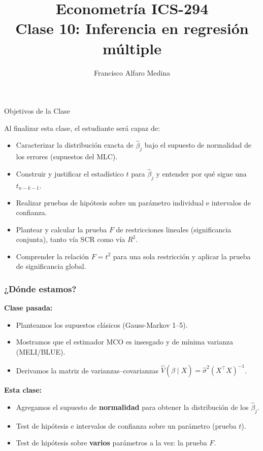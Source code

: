 \documentclass{beamer}
\title[ICS-294]{Econometría ICS-294\\ \small{Clase 10: Inferencia en regresión múltiple}}
\author{Francisco Alfaro Medina}
\institute[USM]
{Universidad Técnica Federico Santa María\\ %
	\medskip
	\textit{francisco.alfaro@usm.cl} %

}
\date{}
\begin{document}
\begin{frame}
	\titlepage %


\end{frame}
\logo{}

\begin{frame}{Objetivos de la Clase}

Al finalizar esta clase, el estudiante será capaz de:

\begin{itemize}
    \item[\checkmark] Caracterizar la distribución exacta de $\hat{\beta}_j$ bajo el supuesto de normalidad de los errores (supuestos del MLC).
    \item[\checkmark] Construir y justificar el estadístico $t$ para $\hat{\beta}_j$ y entender por qué sigue una $t_{n-k-1}$.
    \item[\checkmark] Realizar pruebas de hipótesis sobre un parámetro individual e intervalos de confianza.
    \item[\checkmark] Plantear y calcular la prueba $F$ de restricciones lineales (significancia conjunta), tanto vía SCR como vía $R^2$.
    \item[\checkmark] Comprender la relación $F = t^2$ para una sola restricción y aplicar la prueba de significancia global.
\end{itemize}

\end{frame}

\begin{frame}
\frametitle{¿Dónde estamos?}
\textbf{Clase pasada:}
\begin{itemize}
    \item Planteamos los supuestos clásicos (Gauss-Markov 1--5).
    \item Mostramos que el estimador MCO es insesgado y de mínima varianza (MELI/BLUE).
    \item Derivamos la matriz de varianzas--covarianzas $\hat{V}(\hat{\beta}\mid X) = \hat{\sigma}^2 (X^{\top}X)^{-1}$.
\end{itemize}
\pause
\textbf{Esta clase:}
\begin{itemize}
    \item Agregamos el supuesto de \textbf{normalidad} para obtener la distribución de los $\hat{\beta}_j$.
    \item Test de hipótesis e intervalos de confianza sobre un parámetro (prueba $t$).
    \item Test de hipótesis sobre \textbf{varios} parámetros a la vez: la prueba $F$.
\end{itemize}
\end{frame}
\end{document}
